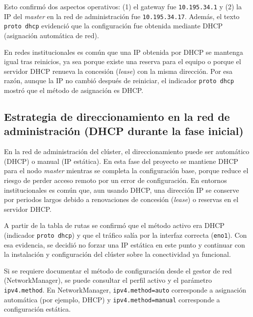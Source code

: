 Esto confirmó dos aspectos operativos: (1) el gateway fue \texttt{10.195.34.1} y (2) la IP del \textit{master} en la red de administración fue \texttt{10.195.34.17}. Además, el texto \texttt{proto dhcp} evidenció que la configuración fue obtenida mediante DHCP (asignación automática de red). \cite{iproute2_ip_route}

En redes institucionales es común que una IP obtenida por DHCP se mantenga igual tras reinicios, ya sea porque existe una reserva para el equipo o porque el servidor DHCP renueva la concesión (\textit{lease}) con la misma dirección. Por esa razón, aunque la IP no cambió después de reiniciar, el indicador \texttt{proto dhcp} mostró que el método de asignación es DHCP.

\subsection{Estrategia de direccionamiento en la red de administración (DHCP durante la fase inicial)}
\label{subsec:dhcp_red_administracion}

En la red de administración del clúster, el direccionamiento puede ser automático (DHCP) o manual (IP estática). En esta fase del proyecto se mantiene DHCP para el nodo \textit{master} mientras se completa la configuración base, porque reduce el riesgo de perder acceso remoto por un error de configuración. En entornos institucionales es común que, aun usando DHCP, una dirección IP se conserve por periodos largos debido a renovaciones de concesión (\textit{lease}) o reservas en el servidor DHCP.

A partir de la tabla de rutas se confirmó que el método activo era DHCP (indicador \texttt{proto dhcp}) y que el tráfico salía por la interfaz correcta (\texttt{eno1}). Con esa evidencia, se decidió no forzar una IP estática en este punto y continuar con la instalación y configuración del clúster sobre la conectividad ya funcional.


Si se requiere documentar el método de configuración desde el gestor de red (NetworkManager), se puede consultar el perfil activo y el parámetro \texttt{ipv4.method}. En NetworkManager, \texttt{ipv4.method=auto} corresponde a asignación automática (por ejemplo, DHCP) y \texttt{ipv4.method=manual} corresponde a configuración estática. \cite{nm_settings_nmcli,rhel9_networking}

